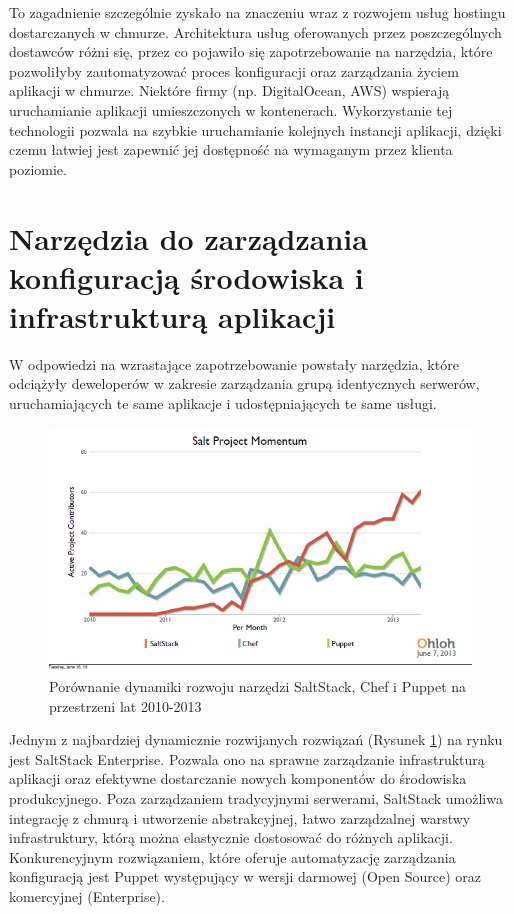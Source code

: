  To zagadnienie szczególnie zyskało na znaczeniu wraz z rozwojem usług hostingu dostarczanych w chmurze. Architektura usług oferowanych przez poszczególnych dostawców różni się, przez co pojawiło się zapotrzebowanie na narzędzia, które pozwoliłyby zautomatyzować proces konfiguracji oraz zarządzania życiem aplikacji w chmurze. Niektóre firmy (np. DigitalOcean, AWS) wspierają uruchamianie aplikacji umieszczonych w kontenerach. Wykorzystanie tej technologii pozwala na szybkie uruchamianie kolejnych instancji aplikacji, dzięki czemu łatwiej jest zapewnić jej dostępność na wymaganym przez klienta poziomie.

 \section{Narzędzia do zarządzania konfiguracją środowiska i infrastrukturą aplikacji}

W odpowiedzi na wzrastające zapotrzebowanie powstały narzędzia, które odciążyły deweloperów w zakresie zarządzania grupą identycznych serwerów, uruchamiających te same aplikacje i udostępniających te same usługi.

\begin{figure}[h] \centering %
	\includegraphics[scale=0.4]{img/salt.png}
	\caption{Porównanie dynamiki rozwoju narzędzi SaltStack, Chef i Puppet na przestrzeni lat 2010-2013\cite{virtualization}}
	\label{salt:chart}
\end{figure}

Jednym z najbardziej dynamicznie rozwijanych rozwiązań (Rysunek \ref{salt:chart}) na rynku jest SaltStack Enterprise\cite{saltstack}. Pozwala ono na sprawne zarządzanie infrastrukturą aplikacji oraz efektywne dostarczanie nowych komponentów do środowiska produkcyjnego. Poza zarządzaniem tradycyjnymi serwerami, SaltStack umożliwa integrację z chmurą i utworzenie abstrakcyjnej, łatwo zarządzalnej warstwy infrastruktury, którą można elastycznie dostosować do różnych aplikacji.
Konkurencyjnym rozwiązaniem, które oferuje automatyzację zarządzania konfiguracją jest Puppet \cite{puppet} występujący w wersji darmowej (Open Source) oraz komercyjnej (Enterprise).

